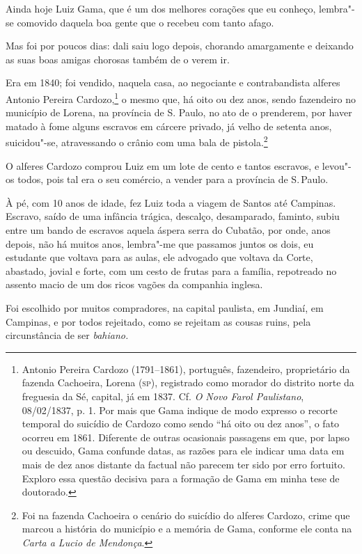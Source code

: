 Ainda hoje Luiz Gama, que é um dos melhores corações que eu conheço,
lembra"-se comovido daquela boa gente que o recebeu com tanto afago.

Mas foi por poucos dias: dali saiu logo depois, chorando amargamente e
deixando as suas boas amigas chorosas também de o verem ir.

Era em 1840; foi vendido, naquela casa, ao negociante e contrabandista
alferes Antonio Pereira Cardozo,\footnote{Antonio Pereira Cardozo
  (1791--1861), português, fazendeiro, proprietário da fazenda Cachoeira,
  Lorena (\textsc{sp}), registrado como morador do distrito norte da freguesia da
  Sé, capital, já em 1837. Cf. \emph{O Novo Farol Paulistano},
  08/02/1837, p. 1. Por mais que Gama indique de modo expresso o
  recorte temporal do suicídio de Cardozo como sendo ``há oito ou dez
  anos'', o fato ocorreu em 1861. Diferente de outras ocasionais
  passagens em que, por lapso ou descuido, Gama confunde datas, as razões
  para ele indicar uma data em mais de dez anos distante da factual não
  parecem ter sido por erro fortuito. Exploro essa questão decisiva para
  a formação de Gama em minha tese de doutorado.} o mesmo que, há oito
ou dez anos, sendo fazendeiro no município de Lorena, na província de S.
Paulo, no ato de o prenderem, por haver matado à fome alguns escravos em
cárcere privado, já velho de setenta anos, suicidou"-se, atravessando o
crânio com uma bala de pistola.\footnote{Foi na fazenda Cachoeira o
  cenário do suicídio do alferes Cardozo, crime que marcou a história do
  município e a memória de Gama, conforme ele conta na \emph{Carta a
  Lucio de Mendonça}.}

O alferes Cardozo comprou Luiz em um lote de cento e tantos escravos, e
levou"-os todos, pois tal era o seu comércio, a vender para a província
de S.\,Paulo.

À pé, com 10 anos de idade, fez Luiz toda a viagem de Santos até
Campinas. Escravo, saído de uma infância trágica, descalço, desamparado,
faminto, subiu entre um bando de escravos aquela áspera serra do
Cubatão, por onde, anos depois, não há muitos anos, lembra"-me que
passamos juntos os dois, eu estudante que voltava para as aulas, ele
advogado que voltava da Corte, abastado, jovial e forte, com um cesto de
frutas para a família, repotreado no assento macio de um dos ricos
vagões da companhia inglesa.

Foi escolhido por muitos compradores, na capital paulista, em
Jundiaí,
em Campinas, e por todos rejeitado, como se rejeitam as cousas ruins,
pela circunstância de ser \emph{bahiano.}

